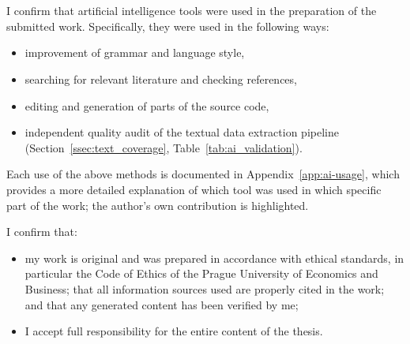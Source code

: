 \hypersetup{pageanchor=true}
\cleardoublepage
\pagestyle{plain}
\openright
\section*{\ProhlaseniAIText}
\noindent

I confirm that artificial intelligence tools were used in the preparation of
the submitted work. Specifically, they were used in the following ways:

\begin{itemize}
\item improvement of grammar and language style,
\item searching for relevant literature and checking references,
\item editing and generation of parts of the source code,
\item independent quality audit of the textual data extraction pipeline
  (Section~\ref{ssec:text_coverage}, Table~\ref{tab:ai_validation}).
\end{itemize}

Each use of the above methods is documented in Appendix~\ref{app:ai-usage},
which provides a more detailed explanation of which tool was used in which
specific part of the work; the author's own contribution is highlighted.

I confirm that:
\begin{itemize}
\item my work is original and was prepared in accordance with ethical standards, in particular the Code of Ethics of the Prague University of Economics and Business; that all information sources used are properly cited in the work; and that any generated content has been verified by me;
\item I accept full responsibility for the entire content of the thesis.
\end{itemize}
